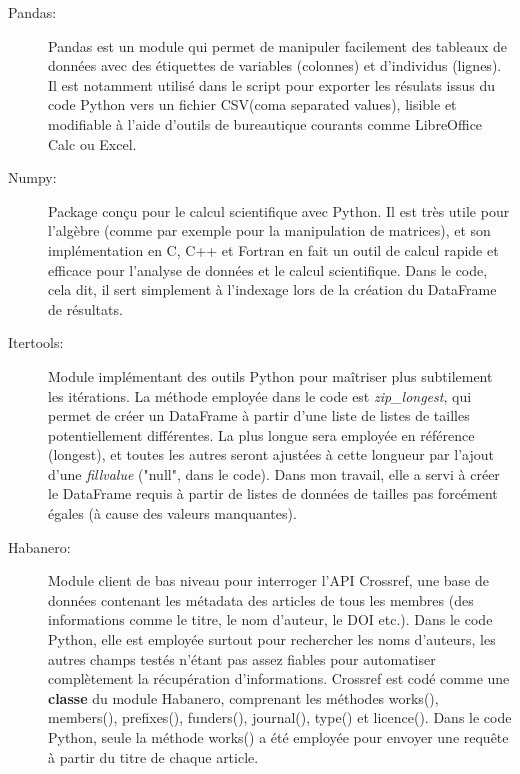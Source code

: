 \documentclass{book}
\begin{document}
\begin{description}
    \item[Pandas:] Pandas est un module qui permet de manipuler facilement des
        tableaux de données avec des étiquettes de variables (colonnes) et d'individus
        (lignes). Il est notamment utilisé dans le script pour exporter les résulats
        issus du code Python vers un fichier CSV(coma separated values), lisible et
        modifiable à l'aide d'outils de bureautique courants comme LibreOffice Calc ou
        Excel.

    \item[Numpy:] Package conçu pour le calcul scientifique avec Python. Il est
        très utile pour l'algèbre (comme par exemple pour la manipulation de matrices),
        et son implémentation en C, C++ et Fortran en fait un outil de calcul rapide et
        efficace pour l'analyse de données et le calcul scientifique. Dans le code,
        cela dit, il sert simplement à l'indexage lors de la création du DataFrame de
        résultats.

    \item[Itertools:] Module implémentant des outils Python pour maîtriser plus
        subtilement les itérations. La méthode employée dans le code est
        \textit{zip\_longest}, qui permet de créer un DataFrame à partir d'une liste de
        listes de tailles potentiellement différentes. La plus longue sera employée en
        référence (longest), et toutes les autres seront ajustées à cette longueur par
        l'ajout d'une \textit{fillvalue} ("null", dans le code). Dans mon travail, elle
        a servi à créer le DataFrame requis à partir de listes de données de tailles
        pas forcément égales (à cause des valeurs manquantes).

    \item[Habanero:] Module client de bas niveau pour interroger l'API
        Crossref, une base de données contenant les métadata des articles de tous les
        membres (des informations comme le titre, le nom d'auteur, le DOI etc.). Dans
        le code Python, elle est employée surtout pour rechercher les noms d'auteurs,
        les autres champs testés n'étant pas assez fiables pour automatiser
        complètement la récupération d'informations. Crossref est codé comme une
        \textbf{classe} du module Habanero, comprenant les méthodes works(), members(),
        prefixes(), funders(), journal(), type() et licence(). Dans le code Python,
        seule la méthode works() a été employée pour envoyer une requête à partir du
        titre de chaque article.


\end{description}
\end{document}
